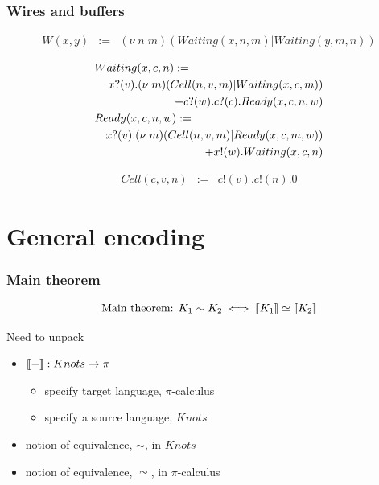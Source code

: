 \documentclass{beamer}
\begin{document}
\begin{frame}
  \frametitle{Wires and buffers}
  \begin{eqnarray}
    W(x,y) & := & (\nu \; n \; m)(Waiting(x,n,m) | Waiting(y,m,n)) \nonumber
  \end{eqnarray}

  \begin{eqnarray}
    \lefteqn{ Waiting(x,c,n) :=} \nonumber \\
    & & x?(v).(\nu \; m)(Cell(n,v,m) | Waiting(x,c,m)) \nonumber \\
    & & + c?(w).c?(c).Ready(x,c,n,w) \nonumber \\
    \lefteqn{ Ready(x,c,n,w) :=} \nonumber \\
    & & x?(v).(\nu \; m)(Cell(n,v,m) | Ready(x,c,m,w)) \nonumber \\
    & & + x!(w).Waiting(x,c,n) \nonumber
  \end{eqnarray}

  \begin{eqnarray}
    Cell(c,v,n) & := & c!(v).c!(n).0 \nonumber
  \end{eqnarray}
\end{frame}

\section{General encoding}
\begin{frame}
  \frametitle{Main theorem}
  \begin{equation}{\mbox{Main theorem: }}
    K_1 \sim K_2 \iff [\![ K_1 ]\!] \simeq [\![ K_2 ]\!] \nonumber
  \end{equation}
  
  Need to unpack

  \begin{itemize}
    \item $[\![ - ]\!] : Knots \to \pi$
      \begin{itemize}
        \item specify target language, $\pi$-calculus
        \item specify a source language, $Knots$
      \end{itemize}
    \item notion of equivalence, $\sim$, in $Knots$
    \item notion of equivalence, $\simeq$, in $\pi$-calculus
  \end{itemize}
\end{frame}
\end{document}
